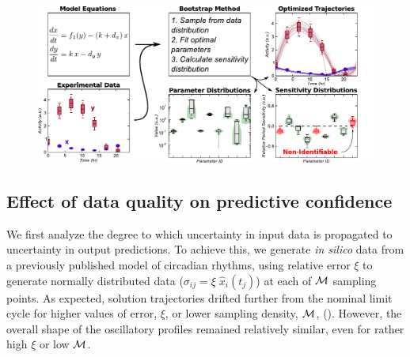 {\begin{figure}[h]
  \centering
  \includegraphics{chap3/figures/fig1.pdf}
  \label{fig:3_1}
\end{figure}

\subsection{Effect of data quality on predictive confidence}

We first analyze the degree to which uncertainty in input data is propagated to uncertainty in output predictions. 
To achieve this, we generate {\itshape in silico} data from a previously published model of circadian rhythms, using relative error $\xi$ to generate normally distributed data ($\sigma_{ij} = \xi \; \hat{x}_{i}(t_j)$) at each of $\cal M$ sampling points. 
As expected, solution trajectories drifted further from the nominal limit cycle for higher values of error, $\xi$, or lower sampling density, $\cal M$, (). 
However, the overall shape of the oscillatory profiles remained relatively similar, even for rather high $\xi$ or low $\cal M$.

}
